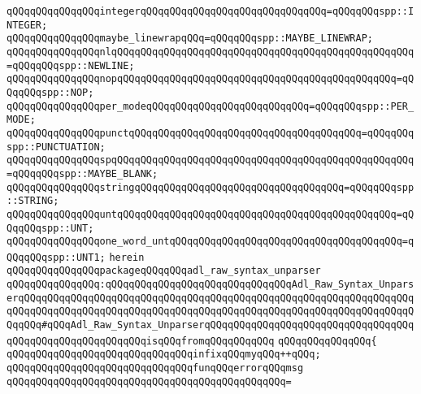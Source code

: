 \verb|qQQqqQQqqQQqqQQqintegerqQQqqQQqqQQqqQQqqQQqqQQqqQQqqQQq=qQQqqQQqspp::INTEGER;|\newline
\verb|qQQqqQQqqQQqqQQqmaybe_linewrapqQQq=qQQqqQQqspp::MAYBE_LINEWRAP;|\newline
\verb|qQQqqQQqqQQqqQQqnlqQQqqQQqqQQqqQQqqQQqqQQqqQQqqQQqqQQqqQQqqQQqqQQqqQQq=qQQqqQQqspp::NEWLINE;|\newline
\verb|qQQqqQQqqQQqqQQqnopqQQqqQQqqQQqqQQqqQQqqQQqqQQqqQQqqQQqqQQqqQQqqQQq=qQQqqQQqspp::NOP;|\newline
\verb|qQQqqQQqqQQqqQQqper_modeqQQqqQQqqQQqqQQqqQQqqQQqqQQq=qQQqqQQqspp::PER_MODE;|\newline
\verb|qQQqqQQqqQQqqQQqpunctqQQqqQQqqQQqqQQqqQQqqQQqqQQqqQQqqQQqqQQq=qQQqqQQqspp::PUNCTUATION;|\newline
\verb|qQQqqQQqqQQqqQQqspqQQqqQQqqQQqqQQqqQQqqQQqqQQqqQQqqQQqqQQqqQQqqQQqqQQq=qQQqqQQqspp::MAYBE_BLANK;|\newline
\verb|qQQqqQQqqQQqqQQqstringqQQqqQQqqQQqqQQqqQQqqQQqqQQqqQQqqQQq=qQQqqQQqspp::STRING;|\newline
\verb|qQQqqQQqqQQqqQQquntqQQqqQQqqQQqqQQqqQQqqQQqqQQqqQQqqQQqqQQqqQQqqQQq=qQQqqQQqspp::UNT;|\newline
\verb|qQQqqQQqqQQqqQQqone_word_untqQQqqQQqqQQqqQQqqQQqqQQqqQQqqQQqqQQqqQQq=qQQqqQQqspp::UNT1;|\newline
\newline
\verb|herein|\newline
\newline
\verb|qQQqqQQqqQQqqQQqpackageqQQqqQQqadl_raw_syntax_unparser|\newline
\verb|qQQqqQQqqQQqqQQq:qQQqqQQqqQQqqQQqqQQqqQQqqQQqqQQqAdl_Raw_Syntax_UnparserqQQqqQQqqQQqqQQqqQQqqQQqqQQqqQQqqQQqqQQqqQQqqQQqqQQqqQQqqQQqqQQqqQQqqQQqqQQqqQQqqQQqqQQqqQQqqQQqqQQqqQQqqQQqqQQqqQQqqQQqqQQqqQQqqQQqqQQqqQQqqQQq#qQQqAdl_Raw_Syntax_UnparserqQQqqQQqqQQqqQQqqQQqqQQqqQQqqQQqqQQqqQQqqQQqqQQqqQQqqQQqqQQqisqQQqfromqQQqqQQqqQQq|\newline
\verb|qQQqqQQqqQQqqQQq{|\newline
\newline
\verb|qQQqqQQqqQQqqQQqqQQqqQQqqQQqqQQqinfixqQQqmyqQQq++qQQq;|\newline
\newline
\verb|qQQqqQQqqQQqqQQqqQQqqQQqqQQqqQQqfunqQQqerrorqQQqmsg|\newline
\verb|qQQqqQQqqQQqqQQqqQQqqQQqqQQqqQQqqQQqqQQqqQQqqQQq=|\newline
